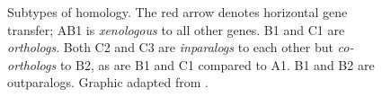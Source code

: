 \begin{figure}[h]
	\begin{center}
		\def\svgwidth{0.8\textwidth}
		
	\end{center}
	\caption[Orthology, paralogy, and xenology]{Subtypes of homology. The red
		arrow denotes horizontal gene transfer; AB1 is \emph{xenologous} to all
		other genes. B1 and C1 are \emph{orthologs}. Both C2 and C3 are
		\emph{inparalogs} to each other but \emph{co-orthologs} to B2, as are B1 and
		C1 compared to A1. B1 and B2 are outparalogs. Graphic adapted from
		\citet{fitch2000}.
	}
	\label{fig:orthology}
\end{figure}
